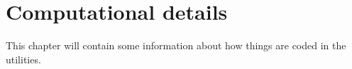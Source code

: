 \chapter{Computational details} \label{chap:ReadData}

This chapter will contain some information about how things are coded in
the utilities.


